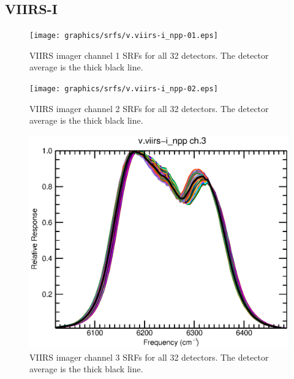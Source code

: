 \subsection{VIIRS-I}
\begin{figure}[H]
  \centering
  \texttt{[image: graphics/srfs/v.viirs-i\_npp-01.eps]}
  \caption{VIIRS imager channel 1 SRFs for all 32 detectors. The detector average is the thick black line.}
  \label{fig:v.viirs-i_npp-01}
\end{figure}
\begin{figure}[H]
  \centering
  \texttt{[image: graphics/srfs/v.viirs-i\_npp-02.eps]}
  \caption{VIIRS imager channel 2 SRFs for all 32 detectors. The detector average is the thick black line.}
  \label{fig:v.viirs-i_npp-02}
\end{figure}
\begin{figure}[H]
  \centering
  \includegraphics[bb= 0 15 400 330,clip,scale=0.8]{graphics/srfs/v.viirs-i_npp-03.eps}
  \caption{VIIRS imager channel 3 SRFs for all 32 detectors. The detector average is the thick black line.}
  \label{fig:v.viirs-i_npp-03}
\end{figure}
